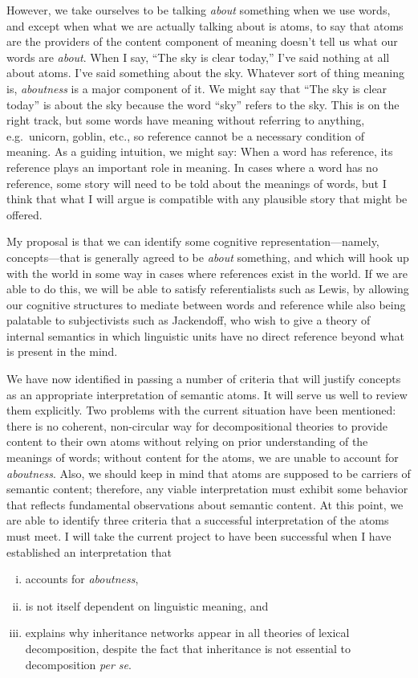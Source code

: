 However, we take ourselves to be talking \emph{about} something when we use words, and except when what we are actually talking about is atoms, to say that atoms are the providers of the content component of meaning doesn't tell us what our words are \emph{about}. When I say, ``The sky is clear today,'' I've said nothing at all about atoms. I've said something about the sky. Whatever sort of thing meaning is, \emph{aboutness} is a major component of it. We might say that ``The sky is clear today'' is about the sky because the word ``sky'' refers to the sky. This is on the right track, but some words have meaning without referring to anything, e.g.\ unicorn, goblin, etc., so reference cannot be a necessary condition of meaning. As a guiding intuition, we might say: When a word has reference, its reference plays an important role in meaning. In cases where a word has no reference, some story will need to be told about the meanings of words, but I think that what I will argue is compatible with any plausible story that might be offered.

My proposal is that we can identify some cognitive representation---namely, concepts---that is generally agreed to be \emph{about} something, and which will hook up with the world in some way in cases where references exist in the world. If we are able to do this, we will be able to satisfy referentialists such as Lewis, by allowing our cognitive structures to mediate between words and reference while also being palatable to subjectivists such as Jackendoff, who wish to give a theory of internal semantics in which linguistic units have no direct reference beyond what is present in the mind.

We have now identified in passing a number of criteria that will justify concepts as an appropriate interpretation of semantic atoms. It will serve us well to review them explicitly. Two problems with the current situation have been mentioned: there is no coherent, non-circular way for decompositional theories to provide content to their own atoms without relying on prior understanding of the meanings of words; without content for the atoms, we are unable to account for \emph{aboutness}. Also, we should keep in mind that atoms are supposed to be carriers of semantic content; therefore, any viable interpretation must exhibit some behavior that reflects fundamental observations about semantic content. At this point, we are able to identify three criteria that a successful interpretation of the atoms must meet. I will take the current project to have been successful when I have established an interpretation that
\begin{enumerate}[(i)]
\item accounts for \emph{aboutness},
\item is not itself dependent on linguistic meaning, and
\item explains why inheritance networks appear in all theories of lexical decomposition, despite the fact that inheritance is not essential to decomposition \emph{per se}.
\end{enumerate}

